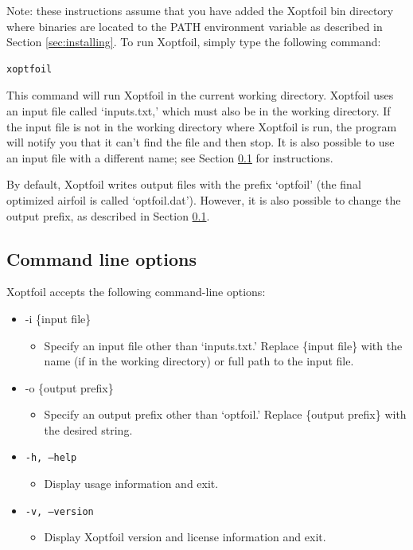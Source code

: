\documentclass[11pt]{article}
\begin{document}
Note: these instructions assume that you have added the Xoptfoil bin directory where 
binaries are
located to the PATH environment variable as described in Section \ref{sec:installing}.
To run Xoptfoil, simply type the following command:

\begin{verbatim}
xoptfoil
\end{verbatim}

\noindent This command will run Xoptfoil in the current working
directory.  Xoptfoil uses an input file called `inputs.txt,' which must also be in the
working directory.  If the input file is not in the working directory where Xoptfoil is
run, the program will notify you that it can't find the file and then stop. It is also
possible
to use an input file with a different name; see Section \ref{sec:CLOs} for instructions.

By default, Xoptfoil writes output files with the prefix `optfoil' (the final optimized
airfoil is called `optfoil.dat'). However, it is also possible to change the output
prefix, as described in Section \ref{sec:CLOs}.

\subsection{Command line options}\label{sec:CLOs}

Xoptfoil accepts the following command-line options:

\begin{itemize}
  \item{-i \{input file\}
  \begin{itemize}
    \item{Specify an input file other than `inputs.txt.' Replace \{input file\} with the
          name (if in the working directory) or full path to the input file.}
  \end{itemize}}
  \item{-o \{output prefix\}
  \begin{itemize}
    \item{Specify an output prefix other than `optfoil.' Replace \{output prefix\} with the
          desired string.}
  \end{itemize}}
  \item{\texttt{-h, --help}
  \begin{itemize}
    \item{Display usage information and exit.}
  \end{itemize}}
  \item{\texttt{-v, --version}
  \begin{itemize}
    \item{Display Xoptfoil version and license information and exit.}
  \end{itemize}}
\end{itemize}
\end{document}
